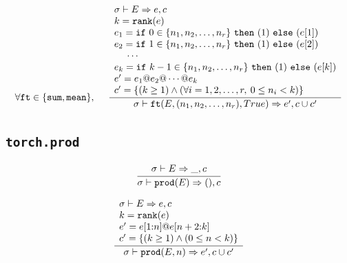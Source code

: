 \documentclass{article}
\begin{document}
\begin{align*}
  \forall \mathtt{ft} \in \{\mathtt{sum}, \mathtt{mean}\},
  \,\,\,\,\,\,\,\,
  \frac
  {
    \begin{array}{l}
      \sigma \vdash E \Rightarrow e, c \\
      k = \mathtt{rank(}e\mathtt{)} \\
      e_1 = \mathtt{if}\,\,0 \in \{n_1, n_2, \dots, n_r\}\,\,\mathtt{then}\,\,(1)\,\,\mathtt{else}\,\,(e[1]) \\
      e_2 = \mathtt{if}\,\,1 \in \{n_1, n_2, \dots, n_r\}\,\,\mathtt{then}\,\,(1)\,\,\mathtt{else}\,\,(e[2]) \\
      \,\,\,\,\,\,\,\, \cdots \\
      e_k = \mathtt{if}\,\,k-1 \in \{n_1, n_2, \dots, n_r\}\,\,\mathtt{then}\,\,(1)\,\,\mathtt{else}\,\,(e[k]) \\
      e' = e_1 \mathtt{@} e_2 \mathtt{@} \cdots \mathtt{@} e_k \\
      c' = \{ (k \geq 1) \land (\forall i=1, 2, \dots, r,\: 0 \leq n_i < k) \}
    \end{array}
  }
  {
    \sigma \vdash \mathtt{ft(}E, (n_1, n_2, \dots, n_r), True\mathtt{)} \Rightarrow e', c \cup c'
  }
\end{align*}

\subsection*{\texttt{torch.prod}}
\begin{align*}
  \frac
  {
    \begin{array}{l}
      \sigma \vdash E \Rightarrow \_, c
    \end{array}
  }
  {
    \sigma \vdash \mathtt{prod(}E\mathtt{)} \Rightarrow (), c
  }
\end{align*}

\begin{align*}
  \frac
  {
    \begin{array}{l}
      \sigma \vdash E \Rightarrow e, c \\
      k = \mathtt{rank(}e\mathtt{)} \\
      e' = e \mathtt{[}1\mathtt{:}n\mathtt{]} \mathtt{@} e \mathtt{[}n+2\mathtt{:}k\mathtt{]} \\
      c' = \{ (k \geq 1) \land (0 \leq n < k) \}
    \end{array}
  }
  {
    \sigma \vdash \mathtt{prod(}E, n\mathtt{)} \Rightarrow e', c \cup c'
  }
\end{align*}
\end{document}
